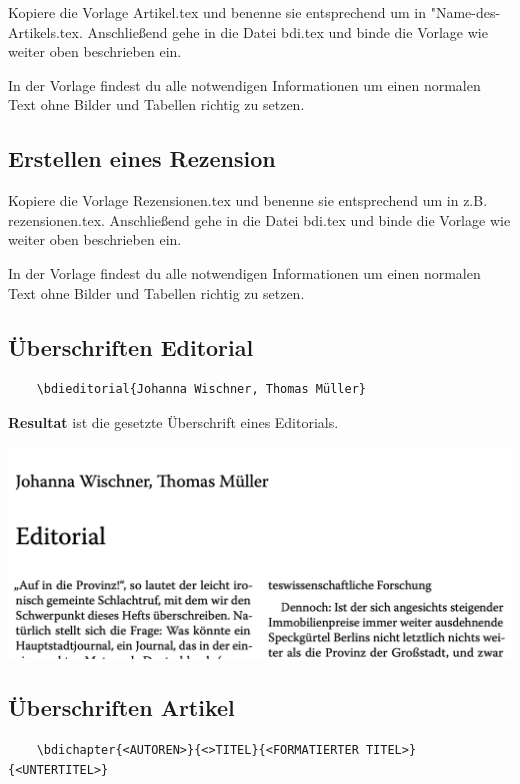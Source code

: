 \documentclass{article}
\begin{document}
Kopiere die Vorlage Artikel.tex und benenne sie entsprechend um in "Name-des-Artikels.tex. Anschließend gehe in die Datei bdi.tex und binde die Vorlage wie weiter oben beschrieben ein.

In der Vorlage findest du alle notwendigen Informationen um einen normalen Text ohne Bilder und Tabellen richtig zu setzen. 

\subsection{Erstellen eines Rezension}

Kopiere die Vorlage Rezensionen.tex und benenne sie entsprechend um in z.B. rezensionen.tex. Anschließend gehe in die Datei bdi.tex und binde die Vorlage wie weiter oben beschrieben ein.

In der Vorlage findest du alle notwendigen Informationen um einen normalen Text ohne Bilder und Tabellen richtig zu setzen. 

\subsection{Überschriften Editorial}

\begin{lstlisting}
    \bdieditorial{Johanna Wischner, Thomas Müller}
\end{lstlisting}

\textbf{Resultat} ist die gesetzte Überschrift eines Editorials.

\begin{center}
    \includegraphics[scale=0.5]{editorial-headline.png}
\end{center}

\subsection{Überschriften Artikel}

\begin{lstlisting}
    \bdichapter{<AUTOREN>}{<>TITEL}{<FORMATIERTER TITEL>}{<UNTERTITEL>}
\end{lstlisting}
\end{document}
